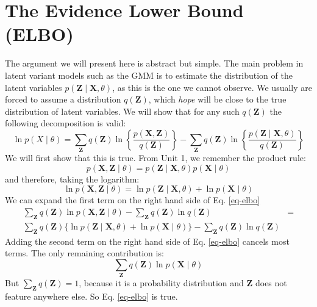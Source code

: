 \section{The Evidence Lower Bound (ELBO)}
\label{sec-elbo}
The argument we will present here is abstract but simple. The main problem in latent variant models such as the GMM is to estimate the distribution of the
latent variables $p(\boldsymbol{Z} \mid \boldsymbol{X}, \theta)$, as this is the one we cannot observe. We usually are forced to assume a distribution
$q(\boldsymbol{Z})$, which \emph{hope} will be close to the true distribution of latent variables. We will show that for any such $q(\boldsymbol{Z})$
the following decomposition is valid:
\begin{equation}
  \ln p(X \mid \theta ) = \sum_{\boldsymbol{Z}} q(\boldsymbol{Z}) \ln \left\{ \frac{p(\boldsymbol{X},\boldsymbol{Z}) }{q (\boldsymbol{Z}) }  \right\}
  - \sum_{\boldsymbol{Z}} q(\boldsymbol{Z} ) \ln \left\{ \frac{p(\boldsymbol{Z} \mid \boldsymbol{X}, \theta)}{q(\boldsymbol{Z})} \right\}
  \label{eq-elbo}
\end{equation}
We will first show that this is true. From Unit 1, we remember the product rule:
$$
p(\boldsymbol{X} ,\boldsymbol{Z} \mid \theta)  = p(\boldsymbol{Z}\mid \boldsymbol{X}, \theta) p(\boldsymbol{X} \mid \theta)
$$
and therefore, taking the logarithm:
$$
\ln p(\boldsymbol{X} ,\boldsymbol{Z} \mid \theta)  = \ln p(\boldsymbol{Z}\mid \boldsymbol{X}, \theta) + \ln p(\boldsymbol{X} \mid \theta)
$$
We can expand the first term on the right hand side of Eq. \ref{eq-elbo}
\begin{align}
\sum_{\boldsymbol{Z}} q(\boldsymbol{Z}) \ln p(\boldsymbol{X}, \boldsymbol{Z} \mid \theta) - \sum_{\boldsymbol{Z}} q(\boldsymbol{Z}) \ln q(\boldsymbol{Z})  &= \nonumber \\
\sum_{\boldsymbol{Z}} q(\boldsymbol{Z}) \{ \ln p(\boldsymbol{Z}\mid \boldsymbol{X}, \theta) + \ln p(\boldsymbol{X} \mid \theta) \} - \sum_{\boldsymbol{Z}} q(\boldsymbol{Z}) \ln q(\boldsymbol{Z}
)
\end{align}
Adding the second term on the right hand side of Eq. \ref{eq-elbo} cancels most terms. The only remaining contribution is:
$$
\sum_{\boldsymbol{Z}} q(\boldsymbol{Z})  \ln p(\boldsymbol{X} \mid \theta) 
$$
But $\sum_{\boldsymbol{Z}} q(\boldsymbol{Z}) =1$, because it is a probability distribution and $\boldsymbol{Z}$ does not feature anywhere else.
So Eq. \ref{eq-elbo} is true.

